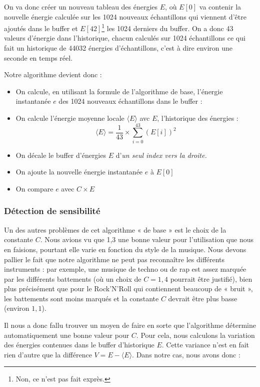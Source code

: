 \par On va donc créer un nouveau tableau des énergies $E$, où $E[0]$ va contenir la nouvelle énergie calculée sur les
1024 nouveaux échantillons qui viennent d'être ajoutés dans le buffer et $E[42]$\footnote{Non, ce n'est pas fait exprès.}
les 1024 derniers du buffer. On a donc 43 valeurs d'énergie dans l'historique, chacun calculés sur 1024 échantillons ce qui
fait un historique de 44032 énergies d'échantillons, c'est à dire environ une seconde en temps réel.

\par Notre algorithme devient donc :

\begin{itemize}
	\item On calcule, en utilisant la formule de l'algorithme de base, l'énergie instantanée $e$ des 1024 nouveaux échantillons dans le buffer :
	\item On calcule l'énergie moyenne locale $\langle E \rangle$ avc $E$, l'historique des énergies :
	$$\langle E \rangle = \frac{1}{43} \times \sum_{i=0}^{43} (E[i])^2$$
	
	\item On décale le buffer d'énergies $E$ d'\em{un seul} index vers la droite.
	\item On ajoute la nouvelle énergie instantanée $e$ à $E[0]$
	\item On compare $e$ avec $C \times E$
\end{itemize}

\subsubsection{Détection de sensibilité}

\par Un des autres problèmes de cet algorithme « de base » est le choix de la constante $C$. Nous avions vu que 1,3 une bonne valeur pour
l'utilisation que nous en faisions, pourtant elle varie en fonction du style de la musique. Nous devons pallier le fait que notre
algorithme ne peut pas reconnaître les différents instruments : par exemple, une musique de techno ou de rap est assez marquée par
les différents battements (où un choix de $C = 1,4$ pourrait être justifié), bien plus précisément que pour le Rock'N'Roll qui contiennent beaucoup de « bruit », les battements
sont moins marqués et la constante $C$ devrait être plus basse (environ $1,1$).

\par Il nous a donc fallu trouver un moyen de faire en sorte que l'algorithme détermine automatiquement une bonne valeur pour $C$.
Pour cela, nous calculons la variation des énergies contenues dans le buffer d'historique $E$.
Cette variance n'est en fait rien d'autre que la différence $V = E - \langle E \rangle$. Dans notre cas, nous avons donc :

